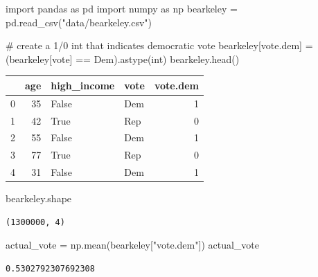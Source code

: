 \documentclass[
  letterpaper,
  DIV=11,
  numbers=noendperiod]{scrreprt}
\newenvironment{Shaded}{\begin{snugshade}}{\end{snugshade}}
\newcommand{\BuiltInTok}[1]{\textcolor[rgb]{0.00,0.23,0.31}{#1}}
\newcommand{\CommentTok}[1]{\textcolor[rgb]{0.37,0.37,0.37}{#1}}
\newcommand{\ImportTok}[1]{\textcolor[rgb]{0.00,0.46,0.62}{#1}}
\newcommand{\NormalTok}[1]{\textcolor[rgb]{0.00,0.23,0.31}{#1}}
\newcommand{\OperatorTok}[1]{\textcolor[rgb]{0.37,0.37,0.37}{#1}}
\newcommand{\StringTok}[1]{\textcolor[rgb]{0.13,0.47,0.30}{#1}}
\begin{document}
\begin{Shaded}
\begin{Highlighting}[]
\ImportTok{import}\NormalTok{ pandas }\ImportTok{as}\NormalTok{ pd}
\ImportTok{import}\NormalTok{ numpy }\ImportTok{as}\NormalTok{ np}
\NormalTok{bearkeley }\OperatorTok{=}\NormalTok{ pd.read\_csv(}\StringTok{"data/bearkeley.csv"}\NormalTok{)}

\CommentTok{\# create a 1/0 int that indicates democratic vote}
\NormalTok{bearkeley[}\StringTok{\textquotesingle{}vote.dem\textquotesingle{}}\NormalTok{] }\OperatorTok{=}\NormalTok{ (bearkeley[}\StringTok{\textquotesingle{}vote\textquotesingle{}}\NormalTok{] }\OperatorTok{==} \StringTok{\textquotesingle{}Dem\textquotesingle{}}\NormalTok{).astype(}\BuiltInTok{int}\NormalTok{)}
\NormalTok{bearkeley.head()}
\end{Highlighting}
\end{Shaded}

\begin{tabular}{lrllr}
\toprule
{} &  age &  high\_income & vote &  vote.dem \\
\midrule
0 &   35 &        False &  Dem &         1 \\
1 &   42 &         True &  Rep &         0 \\
2 &   55 &        False &  Dem &         1 \\
3 &   77 &         True &  Rep &         0 \\
4 &   31 &        False &  Dem &         1 \\
\bottomrule
\end{tabular}

\begin{Shaded}
\begin{Highlighting}[]
\NormalTok{bearkeley.shape}
\end{Highlighting}
\end{Shaded}

\begin{verbatim}
(1300000, 4)
\end{verbatim}

\begin{Shaded}
\begin{Highlighting}[]
\NormalTok{actual\_vote }\OperatorTok{=}\NormalTok{ np.mean(bearkeley[}\StringTok{"vote.dem"}\NormalTok{])}
\NormalTok{actual\_vote}
\end{Highlighting}
\end{Shaded}

\begin{verbatim}
0.5302792307692308
\end{verbatim}
\end{document}
